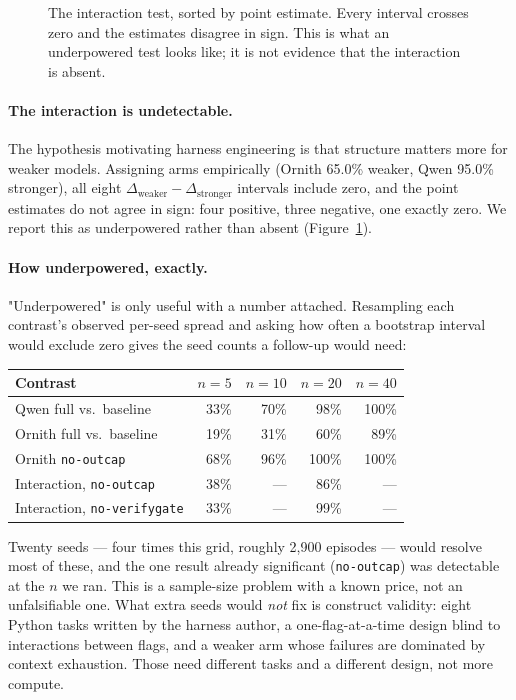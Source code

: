 \documentclass[10pt]{article}
\begin{document}
\begin{figure}[t]
\centering

\caption{The interaction test, sorted by point estimate. Every interval crosses zero and the
estimates disagree in sign. This is what an underpowered test looks like; it is not evidence
that the interaction is absent.}
\label{fig:interaction}
\end{figure}

\paragraph{The interaction is undetectable.}
The hypothesis motivating harness engineering is that structure matters more for weaker models.
Assigning arms empirically (Ornith 65.0\% weaker, Qwen 95.0\% stronger), all eight
$\Delta_{\text{weaker}} - \Delta_{\text{stronger}}$ intervals include zero, and the point
estimates do not agree in sign: four positive, three negative, one exactly zero. We report this
as underpowered rather than absent (Figure~\ref{fig:interaction}).

\paragraph{How underpowered, exactly.}
"Underpowered" is only useful with a number attached. Resampling each contrast's observed
per-seed spread and asking how often a bootstrap interval would exclude zero gives the seed
counts a follow-up would need:

\begin{center}\small
\begin{tabular}{lrrrr}
\toprule
Contrast & $n{=}5$ & $n{=}10$ & $n{=}20$ & $n{=}40$ \\
\midrule
Qwen full vs.\ baseline             & 33\% & 70\% & 98\% & 100\% \\
Ornith full vs.\ baseline           & 19\% & 31\% & 60\% & 89\% \\
Ornith \texttt{no-outcap}           & 68\% & 96\% & 100\% & 100\% \\
Interaction, \texttt{no-outcap}     & 38\% & --- & 86\% & --- \\
Interaction, \texttt{no-verifygate} & 33\% & --- & 99\% & --- \\
\bottomrule
\end{tabular}
\end{center}

\noindent Twenty seeds --- four times this grid, roughly 2{,}900 episodes --- would resolve most
of these, and the one result already significant (\texttt{no-outcap}) was detectable at the $n$
we ran. This is a sample-size problem with a known price, not an unfalsifiable one. What extra
seeds would \emph{not} fix is construct validity: eight Python tasks written by the harness
author, a one-flag-at-a-time design blind to interactions between flags, and a weaker arm whose
failures are dominated by context exhaustion. Those need different tasks and a different design,
not more compute.
\end{document}

